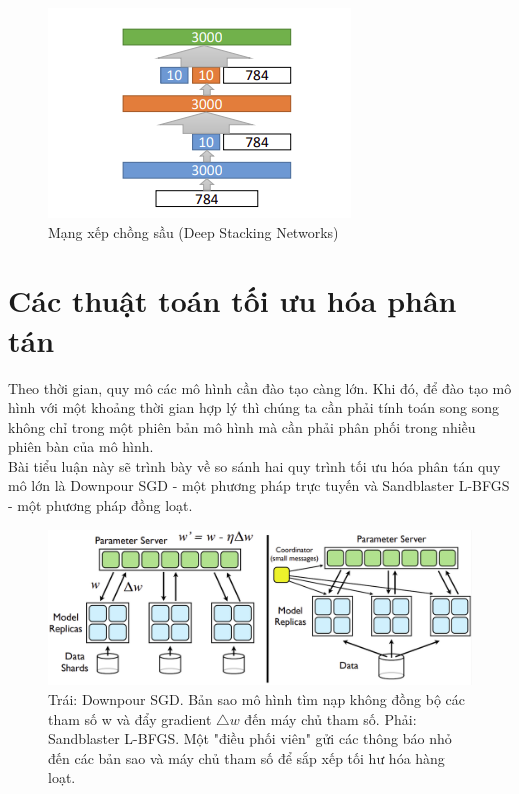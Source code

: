 \documentclass[11pt,a4paper]{article}
\numberwithin{equation}{subsection}
\numberwithin{figure}{subsection}
\numberwithin{table}{subsection}
\begin{document}
\begin{figure}[!h]
\begin{center}
\includegraphics[scale=1.2]{DSN.PNG}
\end{center}
\caption{Mạng xếp chồng sầu (Deep Stacking Networks)}
\end{figure}


\newpage
\section{Các thuật toán tối ưu hóa phân tán}
Theo thời gian, quy mô các mô hình cần đào tạo càng lớn. Khi đó, để đào tạo mô hình với một khoảng thời gian hợp lý thì chúng ta cần phải tính toán song song không chỉ trong một phiên bản mô hình mà cần phải phân phối trong nhiều phiên bàn của mô hình.\\

Bài tiểu luận này sẽ trình bày về so sánh hai quy trình tối ưu hóa phân tán quy mô lớn là Downpour SGD - một phương pháp trực tuyến và Sandblaster L-BFGS - một phương pháp đồng loạt.

\begin{figure}[!h]
\begin{center}
\includegraphics[scale=0.5]{SGD.PNG}
\end{center}
\caption{Trái: Downpour SGD. Bản sao mô hình tìm nạp không đồng bộ các tham số w và đẩy gradient $\bigtriangleup w$ đến máy chủ tham số. Phải:  Sandblaster L-BFGS. Một "điều phối viên" gửi các thông báo nhỏ đến các bản sao và máy chủ tham số để sắp xếp tối hư hóa hàng loạt.   }
\end{figure}
\end{document}
